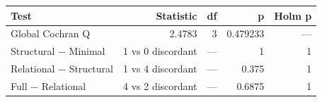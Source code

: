\begin{tabular}{lrrrr}
\toprule
Test & Statistic & df & p & Holm p \\
\midrule
Global Cochran Q & 2.4783 & 3 & 0.479233 & — \\
Structural − Minimal & 1 vs 0 discordant & — & 1 & 1 \\
Relational − Structural & 1 vs 4 discordant & — & 0.375 & 1 \\
Full − Relational & 4 vs 2 discordant & — & 0.6875 & 1 \\
\bottomrule
\end{tabular}

